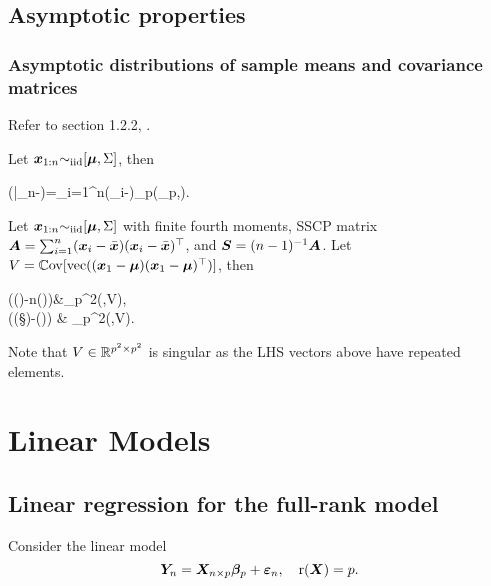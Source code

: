 \documentclass[10pt,a4paper]{book}
\begin{document}
\section{Asymptotic properties}\label{sec:asym_multi}
\subsection{Asymptotic distributions of sample means and covariance matrices}\label{sec:asym_multi_sampleMeanCov}
Refer to section 1.2.2, \cite{muirhead1982aspects}.
\begin{thmbox}
	\begin{theorem}\label{thm:CLT_multi_sampleMean_iid}
		Let ${\boldsymbol x}_{1:n}{\sim}_{\mathrm{iid}}[{\boldsymbol\mu},\Sigma]$, then 
		\begin{sequation*}
			(\bar{\x}_n-\bam)=\sum_{i=1}^{n}(\x_i-\bam)\dto \rmN_p(\0_p,\Sigma). 
		\end{sequation*} 
	\end{theorem}
\end{thmbox}

\begin{thmbox}
	\begin{theorem}\label{thm:CLT_multi_sampleCov_iid}
		Let ${\boldsymbol x}_{1:n}{\sim}_{\mathrm{iid}}[{\boldsymbol\mu},\Sigma]$ with finite fourth moments, SSCP matrix ${\boldsymbol A}=\sum_{i=1}^{n}({\boldsymbol x}_i-\bar{{\boldsymbol x}})({\boldsymbol x}_i-\bar{{\boldsymbol x}})^\top$, and ${\boldsymbol S}=(n-1)^{-1}{\boldsymbol A}$. Let $V=\mathbb{C}\mathrm{ov}[{\mathrm{vec}}(({\boldsymbol x}_1-{\boldsymbol\mu})({\boldsymbol x}_1-{\boldsymbol\mu})^\top)]$, then 
		\begin{sequation*}
			\begin{aligned}
				(\vec(\A)-n\cdot\vec(\Sigma))&\dto \rmN_{p^2}(\0,V), \\
				(\vec(\S)-\vec(\Sigma)) & \dto \rmN_{p^2}(\0,V).
			\end{aligned}
		\end{sequation*}
	\end{theorem}
\end{thmbox}
Note that $V\in\mathbb R^{p^2\times p^2}$ is singular as the LHS vectors above have repeated elements. 


\chapter{Linear Models}\label{chap:linear_models}
\section{Linear regression for the full-rank model}\label{sec:LR_full_rank}
Consider the linear model 
\begin{equation}\label{eq:LR_mat}
	{\boldsymbol Y}_{n}={\boldsymbol X}_{n\times p}{\boldsymbol\beta}_{p}+{\boldsymbol\varepsilon}_n, \quad \mathrm{r}({\boldsymbol X})=p.
\end{equation}
\end{document}
